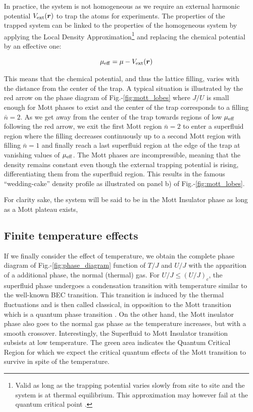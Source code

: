 \label{sec:ch2_trapping_effects}

In practice, the system is not homogeneous as we require an external harmonic potential $V_{\rm{ext}}(\bm{r})$ to trap the atoms for experiments. The properties of the trapped system can be linked to the properties of the homogeneous system by applying the Local Density Approximation\footnote{Valid as long as the trapping potential varies slowly from site to site and the system is at thermal equilibrium. This approximation may however fail at the quantum critical point \cite{pollet2012recent}.} \cite{bergkvist2004local} and replacing the chemical potential by an effective one:

\begin{equation}
    \mu_{\rm{eff}}= \mu - V_{\rm{ext}}(\bm{r})
\end{equation}

\noindent This means that the chemical potential, and thus the lattice filling, varies with the distance from the center of the trap. A typical situation is illustrated by the red arrow on the phase diagram of Fig.-\ref{fig:mott_lobes} where $J/U$ is small enough for Mott phases to exist and the center of the trap corresponds to a filling $\bar{n}=2$. As we get away from the center of the trap towards regions of low $\mu_{\rm{eff}}$ following the red arrow, we exit the first Mott region $\bar{n}=2$ to enter a superfluid region where the filling decreases continuously up to a second Mott region with filling $\bar{n}=1$ and finally reach a last superfluid region at the edge of the trap at vanishing values of $\mu_{\rm{eff}}$. The Mott phases are incompressible, meaning that the density remains constant even though the external trapping potential is rising, differentiating them from the superfluid region. This results in the famous ``wedding-cake'' density profile as illustrated on panel b) of Fig.-\ref{fig:mott_lobes}.

\noindent For clarity sake, the system will be said to be in the Mott Insulator phase as long as a Mott plateau exists, 

\subsection{Finite temperature effects}

If we finally consider the effect of temperature, we obtain the complete phase diagram of Fig.-\ref{fig:phase_diagram} function of $T/J$ and $U/J$ with the apparition of a additional phase, the normal (thermal) gas. For $U/J \leq (U/J)_c$, the superfluid phase undergoes a condensation transition with temperature similar to the well-known BEC transition. This transition is induced by the thermal fluctuations and is then called classical, in opposition to the Mott transition which is a quantum phase transition . On the other hand, the Mott insulator phase also goes to the normal gas phase as the temperature increases, but with a smooth crossover. Interestingly, the Superfluid to Mott Insulator transition subsists at low temperature. The green area indicates the Quantum Critical Region for which we expect the critical quantum effects of the Mott transition to survive in spite of the temperature.

